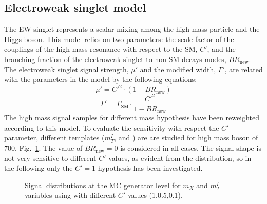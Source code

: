 \subsection*{Electroweak singlet model}
The EW singlet represents a scalar mixing among the high mass particle and the Higgs boson. This model relies on two parameters: the scale factor of the couplings of the high mass resonance with respect to the SM, $C'$, and the branching fraction of the electroweak singlet to non-SM decays modes, $BR_\mathrm{new}$. The electroweak singlet signal strength, $\mu'$ and the modified width, $\Gamma'$, are related with the parameters in the model by the following equations:
\newline
\begin{equation}
\mu' = C'^2 \cdot (1 - BR_\mathrm{new})
\end{equation}
\begin{equation}
\Gamma' = \Gamma_\mathrm{SM} \cdot \frac{C'^2}{1 - BR_\mathrm{new}}
\end{equation}
\newline
The high mass signal samples for different mass hypothesis have been reweighted according to this model.
To evaluate the sensitivity with respect the $C'$ parameter, different templates ($m_T^I$, \mll and \mt) are
are studied  for  high mass boson  of 700\GeV, Fig.~\ref{fig:cprime}.  The value of $BR_\mathrm{new} = 0$ is considered in all cases. 
The signal shape is not very sensitive to different $C'$ values, as evident from the distribution, so in the following only the $C'=1$ 
hypothesis has been investigated.
\begin{figure}[htbp]
\centering
{}
\caption{ Signal distributions at the MC generator level  for $m_X$ and $m_T^I$ variables using  with different   $C'$ values (1,0.5,0.1).}
    \label{fig:cprime}
\end{figure}

